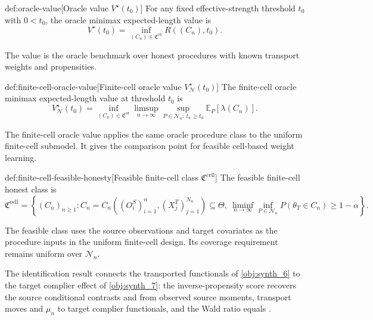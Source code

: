 \begin{definitionv}{def:oracle-value}[Oracle value $V^\star(t_0)$]
For any fixed effective-strength threshold \(t_0\) with \(0<t_0\), the oracle minimax expected-length value is
\[
V^\star(t_0)
=
\inf_{(C_n)\in\mathfrak C^{\mathrm{or}}}
R((C_n),t_0).
\]
\end{definitionv}

The value  is the oracle benchmark over honest procedures with known transport weights and propensities.

\begin{definitionv}{def:finite-cell-oracle-value}[Finite-cell oracle value $V_{\mathcal N}^\star(t_0)$]
The finite-cell oracle minimax expected-length value at threshold \(t_0\) is
\[
V_{\mathcal N}^\star(t_0)
=
\inf_{(C_n)\in\mathfrak C^{\mathrm{or}}}
\limsup_{n\to\infty}
\sup_{P\in\mathcal N_n:\,t_n\ge t_0}
\mathbb E_P[\lambda(C_n)].
\]
\end{definitionv}

The finite-cell oracle value  applies the same oracle procedure class to the uniform finite-cell submodel.  It gives the comparison point for feasible cell-based weight learning.

\begin{definitionv}{def:finite-cell-feasible-honesty}[Feasible finite-cell class $\mathfrak C^{\mathrm{cell}}$]
The feasible finite-cell honest class is
\[
\mathfrak C^{\mathrm{cell}}
=
\left\{
(C_n)_{n\ge1}:
C_n
=
C_n\!\left((O_i^S)_{i=1}^n,(X_j^T)_{j=1}^{N_n}\right)
\subseteq\Theta,\ 
\liminf_{n\to\infty}\inf_{P\in\mathcal N_n}
P(\theta_T\in C_n)
\ge 1-\alpha
\right\}.
\]
\end{definitionv}

The feasible class  uses the source observations and target covariates as the procedure inputs in the uniform finite-cell design.  Its coverage requirement remains uniform over \(\mathcal N_n\).

The identification result connects the transported functionals of \cref{obj:synth_6} to the target complier effect of \cref{obj:synth_7}: the inverse-propensity score recovers the source conditional contrasts  and  from observed source moments, transport moves  and \(\mu_n\) to target complier functionals, and the Wald ratio equals .

